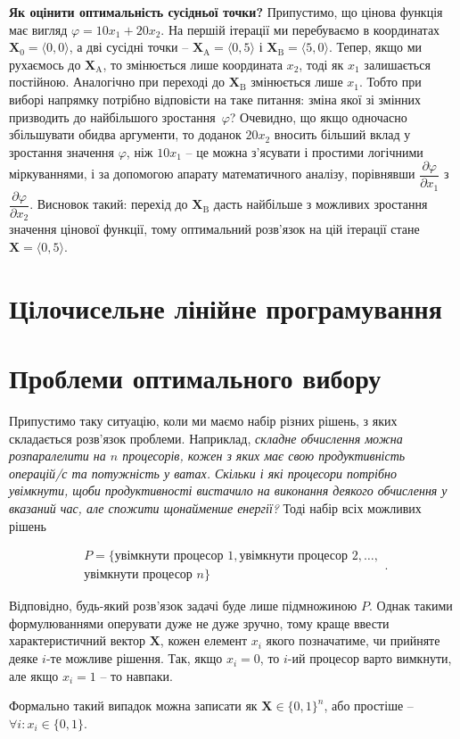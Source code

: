 \documentclass[\main/book.tex]{subfiles}
\begin{document}
\textbf{Як оцінити оптимальність сусідньої точки?} \quad Припустимо, що цінова функція має вигляд $\varphi = 10 x_1 + 20 x_2$. На першій ітерації ми перебуваємо в координатах $\mathbf{X}_0 = \langle 0, 0 \rangle$, а дві сусідні точки -- ${\mathbf{X}_\mathrm{A} = \langle 0, 5 \rangle}$ і ${\mathbf{X}_\mathrm{B} = \langle 5, 0 \rangle}$. Тепер, якщо ми рухаємось до $\mathbf{X}_\mathrm{A}$, то змінюється лише координата $x_2$, тоді як $x_1$ залишається постійною. Аналогічно при переході до $\mathbf{X}_\mathrm{B}$ змінюється лише $x_1$. Тобто при виборі напрямку потрібно відповісти на таке питання: зміна якої зі змінних призводить до найбільшого зростання~$\varphi$? Очевидно, що якщо одночасно збільшувати обидва аргументи, то доданок $20x_2$ вносить більший вклад у зростання значення $\varphi$, ніж $10x_1$ -- це можна з'ясувати і простими логічними міркуваннями, і за допомогою апарату математичного аналізу, порівнявши $\dfrac{\partial \varphi}{\partial x_1}$ з $\dfrac{\partial \varphi}{\partial x_2}$. Висновок такий: перехід до $\mathbf{X}_\mathrm{B}$ дасть найбільше з можливих зростання значення цінової функції, тому оптимальний розв'язок на цій ітерації стане $\mathbf{X} = \langle 0, 5 \rangle$.
\section{Цілочисельне лінійне програмування}
\label{section:linear:integer}

\section{Проблеми оптимального вибору}
\label{section:linear:x_in_0-1}

Припустимо таку ситуацію, коли ми маємо набір різних рішень, з яких складається розв'язок проблеми. Наприклад, \textit{складне обчислення можна розпаралелити на $n$ процесорів, кожен з яких має свою продуктивність операцій/с та потужність у ватах. Скільки і які процесори потрібно увімкнути, щоби продуктивності вистачило на виконання деякого обчислення у вказаний час, але спожити щонайменше енергії?} Тоді набір всіх можливих рішень

\[
\begin{split}
P = \{
 \text{увімкнути процесор 1},
 \text{увімкнути процесор 2},
 \ldots, \\
 \text{увімкнути процесор $n$}
\}
\end{split}
.
\]

Відповідно, будь-який розв'язок задачі буде лише підмножиною $P$. Однак такими формулюваннями оперувати дуже не дуже зручно, тому краще ввести характеристичний вектор $\mathbf{X}$, кожен елемент $x_i$ якого позначатиме, чи прийняте деяке $i$-те можливе рішення. Так, якщо $x_i=0$, то $i$-ий процесор варто вимкнути, але якщо $x_i=1$ -- то навпаки.

\begin{note}
 Формально такий випадок можна записати як $\mathbf{X} \in \{0, 1\}^{n}$, або простіше -- $\forall i: x_i \in \{0, 1\}$.
\end{note}
\end{document}
